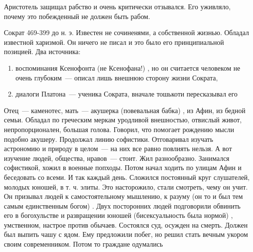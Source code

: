 Аристотель защищал рабство и очень критически отзывался. Его уживляло, почему это побежденный не должен быть рабом. 

Сократ
469-399 до н. э. 
Известен не сочиненями, а собственной жизнью. Обладал известной харизмой. Он ничего не писал и это было его принципиальной позицией. Два источника: 

\begin{enumerate}
	\item воспоминания Ксенофонта (не Ксенофана!) , но он считается человеком не очень глубоким~--- описал лишь внешнюю сторону жизни Сократа, 
	\item диалоги Платона~--- ученика Сократа, вначале тошькоти пересказывал его
\end{enumerate}

Отец~--- каменотес, мать~--- акушерка (повевальная бабка) , из Афин, из бедной семьи. Обладал по греческим меркам уродливой внешностью, отвислый живот, непропорционален, большая голова. 
Говорил, что помогает рождению мысли подобно акушеру. Продолжал линию софистики. Отговаривал изучать астрономию и природу в целом~--- на них все равно повлиять нельзя. А вот изучение людей, общества, нравов~--- стоит. 
Жил разнообразно. Занимался софистикой, хожил в военные попходы. Потом начал ходить по улицам Афин и беседовать со всеми. И так каждый день. 
Сложился постоянный круг слушателей, молодых юношей, в т. ч. элиты. Это насторожило, стали смотреть, чему он учит. 
Он призывал людей к самостоятельному мышлению, к разуму (он то и был тем самым единственным богом) . 
Двух посторонних людей подговорили обвинить его в богохульстве и развращении юношей (бисексуальность была нормой) , умственном, настрое против обычаев. 
Состоялся суд, осужден на смерть. Должен был выпить чашу с ядом. Ему предложили побег, но решил стать вечным укором своим современником. Потом то граждане одумались
